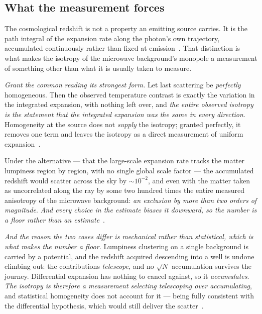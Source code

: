 \documentclass[11pt,a4paper]{article}
\theoremstyle{plain}
\theoremstyle{definition}
\begin{document}
\subsection{What the measurement forces}

The cosmological redshift is not a property an emitting source carries. It is the path integral of the
expansion rate along the photon's own trajectory, accumulated continuously rather than fixed at
emission~\cite{JanzenModernParallax}. That distinction is what makes the isotropy of the microwave
background's monopole a measurement of something other than what it is usually taken to measure.

\emph{Grant the common reading its strongest form.} Let last scattering be \emph{perfectly} homogeneous.
Then the observed temperature contrast is exactly the variation in the integrated expansion, with nothing
left over, and \emph{the entire observed isotropy is the statement that the integrated expansion was the
same in every direction}. Homogeneity at the source does not \emph{supply} the isotropy; granted perfectly,
it removes one term and leaves the isotropy as a direct measurement of uniform
expansion~\cite{JanzenModernParallax}.

Under the alternative --- that the large-scale expansion rate tracks the matter lumpiness region by region,
with no single global scale factor --- the accumulated redshift would scatter across the sky by
$\sim10^{-2}$, and even with the matter taken as uncorrelated along the ray by some two hundred times the
entire measured anisotropy of the microwave background: \emph{an exclusion by more than two orders of
magnitude}. \emph{And every choice in the estimate biases it downward, so the number is a floor rather than
an estimate}~\cite{JanzenModernParallax}.

\emph{And the reason the two cases differ is mechanical rather than statistical, which is what makes the
number a floor.} Lumpiness clustering on a single background is carried by a potential, and the redshift
acquired descending into a well is undone climbing out: the contributions \emph{telescope}, and no
$\sqrt{N}$ accumulation survives the journey. Differential expansion has nothing to cancel against, so it
\emph{accumulates}. \emph{The isotropy is therefore a measurement selecting telescoping over accumulating},
and statistical homogeneity does not account for it --- being fully consistent with the differential
hypothesis, which would still deliver the scatter~\cite{JanzenModernParallax}.
\end{document}
